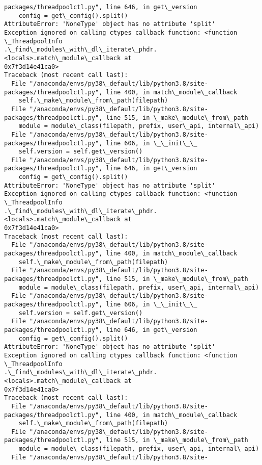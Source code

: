 \documentclass[11pt]{article}
\begin{document}
\begin{Verbatim}[commandchars=\\\{\}]
packages/threadpoolctl.py", line 646, in get\_version
    config = get\_config().split()
AttributeError: 'NoneType' object has no attribute 'split'
Exception ignored on calling ctypes callback function: <function \_ThreadpoolInfo
.\_find\_modules\_with\_dl\_iterate\_phdr.<locals>.match\_module\_callback at
0x7f3d14e41ca0>
Traceback (most recent call last):
  File "/anaconda/envs/py38\_default/lib/python3.8/site-
packages/threadpoolctl.py", line 400, in match\_module\_callback
    self.\_make\_module\_from\_path(filepath)
  File "/anaconda/envs/py38\_default/lib/python3.8/site-
packages/threadpoolctl.py", line 515, in \_make\_module\_from\_path
    module = module\_class(filepath, prefix, user\_api, internal\_api)
  File "/anaconda/envs/py38\_default/lib/python3.8/site-
packages/threadpoolctl.py", line 606, in \_\_init\_\_
    self.version = self.get\_version()
  File "/anaconda/envs/py38\_default/lib/python3.8/site-
packages/threadpoolctl.py", line 646, in get\_version
    config = get\_config().split()
AttributeError: 'NoneType' object has no attribute 'split'
Exception ignored on calling ctypes callback function: <function \_ThreadpoolInfo
.\_find\_modules\_with\_dl\_iterate\_phdr.<locals>.match\_module\_callback at
0x7f3d14e41ca0>
Traceback (most recent call last):
  File "/anaconda/envs/py38\_default/lib/python3.8/site-
packages/threadpoolctl.py", line 400, in match\_module\_callback
    self.\_make\_module\_from\_path(filepath)
  File "/anaconda/envs/py38\_default/lib/python3.8/site-
packages/threadpoolctl.py", line 515, in \_make\_module\_from\_path
    module = module\_class(filepath, prefix, user\_api, internal\_api)
  File "/anaconda/envs/py38\_default/lib/python3.8/site-
packages/threadpoolctl.py", line 606, in \_\_init\_\_
    self.version = self.get\_version()
  File "/anaconda/envs/py38\_default/lib/python3.8/site-
packages/threadpoolctl.py", line 646, in get\_version
    config = get\_config().split()
AttributeError: 'NoneType' object has no attribute 'split'
Exception ignored on calling ctypes callback function: <function \_ThreadpoolInfo
.\_find\_modules\_with\_dl\_iterate\_phdr.<locals>.match\_module\_callback at
0x7f3d14e41ca0>
Traceback (most recent call last):
  File "/anaconda/envs/py38\_default/lib/python3.8/site-
packages/threadpoolctl.py", line 400, in match\_module\_callback
    self.\_make\_module\_from\_path(filepath)
  File "/anaconda/envs/py38\_default/lib/python3.8/site-
packages/threadpoolctl.py", line 515, in \_make\_module\_from\_path
    module = module\_class(filepath, prefix, user\_api, internal\_api)
  File "/anaconda/envs/py38\_default/lib/python3.8/site-

\end{Verbatim}
\end{document}
